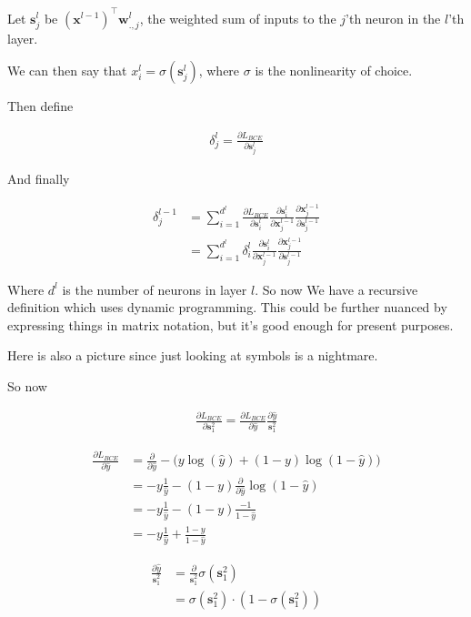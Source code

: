 \documentclass{article}
\begin{document}
	Let $\mathbf{s}^l_{j}$ be $(\mathbf{x}^{l-1})^\top\mathbf{w}^l_{.,j}$, the weighted sum of inputs to the $j$'th neuron in the $l$'th layer.
	
	We can then say that $x^l_i = \sigma(\mathbf{s}^l_j)$, where $\sigma$ is the nonlinearity of choice.
	
	Then define
	
	\begin{align}
		\delta^l_j = \frac{\partial L_{BCE}}{\partial \mathbf{s}^l_j}
	\end{align}
	
	And finally 
	
	\begin{align}
		\delta^{l-1}_j &= \sum^{d^l}_{i=1}\frac{\partial L_{BCE}}{\partial \mathbf{s}^l_i} \frac{\partial \mathbf{s}^l_i}{\partial \mathbf{x}^{l-1}_j}\frac{\partial \mathbf{x}^{l-1}_j}{\partial \mathbf{s}^{l-1}_j}\\
		&= \sum^{d^l}_{i=1}  \delta^l_i \frac{\partial \mathbf{s}^l_i}{\partial \mathbf{x}^{l-1}_j}\frac{\partial \mathbf{x}^{l-1}_j}{\partial \mathbf{s}^{l-1}_j}
	\end{align}
	
	Where $d^l$ is the number of neurons in layer $l$. So now We have a recursive definition which uses dynamic programming. This could be further nuanced by expressing things in matrix notation, but it's good enough for present purposes.
	
	 Here is also a picture since just looking at symbols is a nightmare.
	 
	 So now
	 
	 \begin{align}
	 	\frac{\partial L_{BCE}}{\partial \mathbf{s}^2_1} = \frac{\partial L_{BCE}}{\partial \hat{y}} \frac{\partial \hat{y}}{\mathbf{s}^2_1} 
	 \end{align}
	 
	 \begin{align}
	 	\frac{\partial L_{BCE}}{\partial \hat{y}} &= \frac{\partial }{\partial \hat{y}}-\big(y\log(\hat{y}) + (1-y)\log(1-\hat{y}) \big)\\
	 	&=-y\frac{1}{\hat{y}}  - (1-y)\frac{\partial }{\partial \hat{y}} \log(1-\hat{y}) \\
	 	&=-y\frac{1}{\hat{y}}  - (1-y)\frac{-1}{1-\hat{y}}\\
	 	&=-y\frac{1}{\hat{y}}  + \frac{1-y}{1-\hat{y}}
	 \end{align}
	 
	 \begin{align}
	 	\frac{\partial \hat{y}}{\mathbf{s}^2_1}  &= \frac{\partial }{\mathbf{s}^2_1} \sigma(\mathbf{s}^2_1)\\
	 	&= \sigma(\mathbf{s}^2_1)\cdot(1-\sigma(\mathbf{s}^2_1))
	 \end{align}
	 
\end{document}
